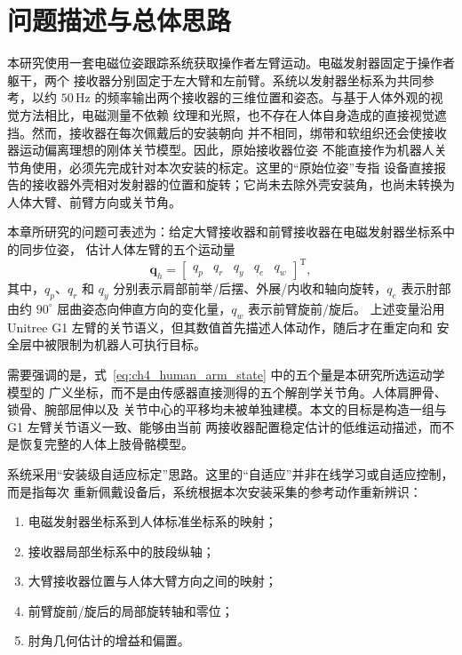 \section{问题描述与总体思路}
\label{sec:ch4_problem_overview}

本研究使用一套电磁位姿跟踪系统获取操作者左臂运动。电磁发射器固定于操作者躯干，两个
接收器分别固定于左大臂和左前臂。系统以发射器坐标系为共同参考，以约 $50\,\mathrm{Hz}$
的频率输出两个接收器的三维位置和姿态。与基于人体外观的视觉方法相比，电磁测量不依赖
纹理和光照，也不存在人体自身造成的直接视觉遮挡。然而，接收器在每次佩戴后的安装朝向
并不相同，绑带和软组织还会使接收器运动偏离理想的刚体关节模型。因此，原始接收器位姿
不能直接作为机器人关节角使用，必须先完成针对本次安装的标定。这里的“原始位姿”专指
设备直接报告的接收器外壳相对发射器的位置和旋转；它尚未去除外壳安装角，也尚未转换为
人体大臂、前臂方向或关节角。

本章所研究的问题可表述为：给定大臂接收器和前臂接收器在电磁发射器坐标系中的同步位姿，
估计人体左臂的五个运动量
\begin{equation}
  \boldsymbol q_h =
  \begin{bmatrix}
    q_p & q_r & q_y & q_e & q_w
  \end{bmatrix}^{\mathrm T},
  \label{eq:ch4_human_arm_state}
\end{equation}
其中，$q_p$、$q_r$ 和 $q_y$ 分别表示肩部前举/后摆、外展/内收和轴向旋转，$q_e$
表示肘部由约 $90^\circ$ 屈曲姿态向伸直方向的变化量，$q_w$ 表示前臂旋前/旋后。
上述变量沿用 Unitree G1 左臂的关节语义，但其数值首先描述人体动作，随后才在重定向和
安全层中被限制为机器人可执行目标。

需要强调的是，式~\eqref{eq:ch4_human_arm_state} 中的五个量是本研究所选运动学模型的
广义坐标，而不是由传感器直接测得的五个解剖学关节角。人体肩胛骨、锁骨、腕部屈伸以及
关节中心的平移均未被单独建模。本文的目标是构造一组与 G1 左臂关节语义一致、能够由当前
两接收器配置稳定估计的低维运动描述，而不是恢复完整的人体上肢骨骼模型。

系统采用“安装级自适应标定”思路。这里的“自适应”并非在线学习或自适应控制，而是指每次
重新佩戴设备后，系统根据本次安装采集的参考动作重新辨识：
\begin{enumerate}[label=\arabic*)]
  \item 电磁发射器坐标系到人体标准坐标系的映射；
  \item 接收器局部坐标系中的肢段纵轴；
  \item 大臂接收器位置与人体大臂方向之间的映射；
  \item 前臂旋前/旋后的局部旋转轴和零位；
  \item 肘角几何估计的增益和偏置。
\end{enumerate}

